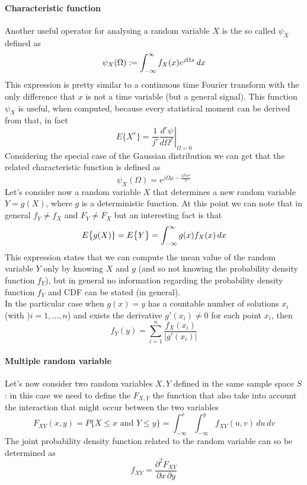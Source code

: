 	\paragraph{Characteristic function} Another useful operator for analysing  a random variable $X$ is the so called  $\psi_X$ defined as 
	\begin{equation}
		\psi_X(\Omega) := \int_{-\infty}^\infty f_X(x) e^{j\Omega x}\, dx
	\end{equation}
	This expression is pretty similar to a continuous time Fourier transform with the only difference that $x$ is not a time variable (but a general signal). This function $\psi_X$ is useful, when computed, because every statistical moment can be derived from that, in fact
	\begin{equation}
		E\big\{X^r\big\} =  \frac 1 {j^r} \left.\frac{d^r\psi}{d\Omega^r} \right|_{\Omega = 0}
	\end{equation}
	Considering the special case of the Gaussian distribution we can get that the related characteristic function is defined as
	\[ \psi_X(\Omega) = e^{j\Omega\mu - \frac{\Omega^2\sigma^2}{2}}    \]
	Let's consider now a random variable $X$ that determines a new random variable $Y=g(X)$, where $g$ is a deterministic function. At this point we can note that in general $f_Y \neq f_X$ and $F_Y \neq F_X$ but an interesting fact is that
	\[ E\big\{g(X)\}  = E\big\{Y\big\} = \int_{-\infty}^\infty g(x) f_X(x)\, dx \]
	This expression states that we can compute the mean value of the random variable $Y$ only by knowing $X$ and $g$ (and so not knowing the probability density function $f_Y$), but in general no information regarding the probability density function $f_Y$ and CDF can be stated (in general).\\
	In the particular case when $g(x) = y$ has a countable number of solutions $x_i$ (with )$i=1,\dots,n$) and exists the derivative $g'(x_i) \neq 0$ for each point $x_i$, then 
	\[f_Y(y) = \sum_{i=1}^{n} \frac{f_X(x_i)}{|g'(x_i)|}\]
	
	\paragraph{Multiple random variable} Let's now consider two random variables $X,Y$ defined in the same sample space $S$: in this case we need to define the  $F_{X,Y}$ the function that also take into account the interaction that might occur between the two variables
	\begin{equation}
		F_{XY}(x,y) = P\big\{X\leq x \textrm{ and } Y \leq y \big\} = \int_{-\infty}^x \int_{-\infty}^y f_{XY}(u,v)\, du \, dv
	\end{equation}
	The joint probability density function related to the random variable can so be determined as
	\[f_{XY} = \frac{\partial^2 F_{XY}}{\partial x\, \partial y} \]
	

